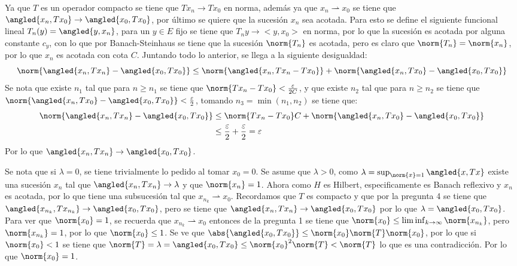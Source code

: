 \documentclass{homework}
\begin{document}
\begin{sol}
    Ya que \(T\) es un operador compacto se tiene que \(Tx_n\rightarrow Tx_0\) en norma, además ya que \(x_n\rightharpoonup x_0\) se tiene que \(\angled{x_n,Tx_0}\rightarrow\angled{x_0,Tx_0}\), por último se quiere que la sucesión \(x_n\) sea acotada. Para esto se define el siguiente funcional lineal \(T_n(y)=\angled{y,x_n}\), para un \(y\in E\) fijo se tiene que \(T_ny\rightarrow <y,x_0>\) en norma, por lo que la sucesión es acotada por alguna constante \(c_y\), con lo que por Banach-Steinhaus se tiene que la sucesión \(\norm{T_n}\) es acotada, pero es claro que \(\norm{T_n}=\norm{x_n}\), por lo que \(x_n\) es acotada con cota \(C\). Juntando todo lo anterior, se llega a la siguiente desigualdad:
    \begin{equation*}
        \norm{\angled{x_n,Tx_n}-\angled{x_0,Tx_0}}\leq\norm{\angled{x_n,Tx_n-Tx_0}}+\norm{\angled{x_n,Tx_0}-\angled{x_0,Tx_0}}
    \end{equation*}
    Se nota que existe \(n_1\) tal que para \(n\geq n_1\) se tiene que \(\norm{Tx_n-Tx_0}<\frac\varepsilon{2C}\), y que existe \(n_2\) tal que para \(n\geq n_2\) se tiene que \(\norm{\angled{x_n,Tx_0}-\angled{x_0,Tx_0}}<\frac\varepsilon2\), tomando \(n_3=\min(n_1,n_2)\) se tiene que:
    \begin{align*}
        \norm{\angled{x_n,Tx_n}-\angled{x_0,Tx_0}}&\leq\norm{Tx_n-Tx_0}C+\norm{\angled{x_n,Tx_0}-\angled{x_0,Tx_0}}\\
        &\leq\frac\varepsilon2+\frac\varepsilon2=\varepsilon
    \end{align*}
    Por lo que \(\angled{x_n,Tx_n}\rightarrow\angled{x_0,Tx_0}\).
\end{sol}

\begin{sol}
    Se nota que si \(\lambda=0\), se tiene trivialmente lo pedido al tomar \(x_0=0\). Se asume que \(\lambda>0\), como \(\lambda=\sup_{\norm{x}=1}\angled{x,Tx}\) existe una sucesión \(x_n\) tal que \(\angled{x_n,Tx_n}\rightarrow\lambda\) y que \(\norm{x_n}=1\). Ahora como \(H\) es Hilbert, especificamente es Banach reflexivo y \(x_n\) es acotada, por lo que tiene una subsucesión tal que \(x_{n_k}\rightharpoonup x_0\). Recordamos que \(T\) es compacto y que por la pregunta 4 se tiene que \(\angled{x_{n_k},Tx_{n_k}}\rightarrow\angled{x_0,Tx_0}\), pero se tiene que \(\angled{x_n,Tx_n}\rightarrow \angled{x_0,Tx_0}\) por lo que \(\lambda=\angled{x_0,Tx_0}\). Para ver que \(\norm{x_0}=1\), se recuerda que \(x_{n_k}\rightharpoonup x_0\) entonces de la pregunta 1 se tiene que \(\norm{x_0}\leq\liminf_{k\rightarrow\infty}\norm{x_{n_k}}\), pero \(\norm{x_{n_k}}=1\), por lo que \(\norm{x_0}\leq1\). Se ve que \(\abs{\angled{x_0,Tx_0}}\leq\norm{x_0}\norm{T}\norm{x_0}\), por lo que si \(\norm{x_0}<1\) se tiene que \(\norm{T}=\lambda=\angled{x_0,Tx_0}\leq\norm{x_0}^2\norm{T}<\norm{T}\) lo que es una contradicción. Por lo que \(\norm{x_0}=1\).
\end{sol}
\end{document}
